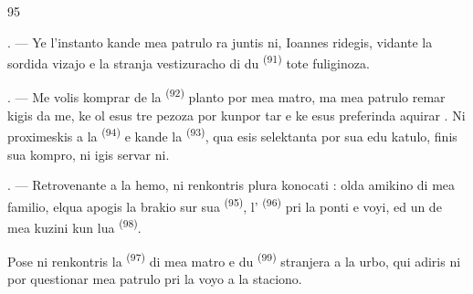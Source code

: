 \begin{VUpage}[97]{95}
\VUsaut{3.0mm}

. --- Ye l'instanto kande mea patrulo ra\cc
juntis ni, Ioannes ridegis, vidante la sordida\nl
vizajo e la stranja vestizuracho di du \cc
{} \textsuperscript{(91)} tote fuliginoza.

. --- Me volis komprar de la  \textsuperscript{(92)}\nl
planto por mea matro, ma mea patrulo remar\cc
kigis da me, ke ol esus tre pezoza por kunpor\cc
tar e ke esus preferinda aquirar . Ni\nl
proximeskis a la  \textsuperscript{(94)} e kande la\nl
{} \textsuperscript{(93)}, qua esis selektanta por sua edu\cc
katulo, finis sua kompro, ni igis servar ni.

. --- Retrovenante a la hemo, ni renkontris\nl
plura konocati : olda amikino di mea familio,\nl
elqua apogis la brakio sur sua \cc
{} \textsuperscript{(95)}, l' \textsuperscript{(96)} pri la ponti e voyi, ed\nl
un de mea kuzini kun lua \cc
{} \textsuperscript{(98)}.

\VUblancAlinea
Pose ni renkontris la  \textsuperscript{(97)} di mea\nl
matro e du  \textsuperscript{(99)} stranjera a la urbo, qui\nl
adiris ni por questionar mea patrulo pri la\nl
voyo a la staciono.

\VUsaut{6.0mm}
\VUfilet{22mm}
\end{VUpage}
